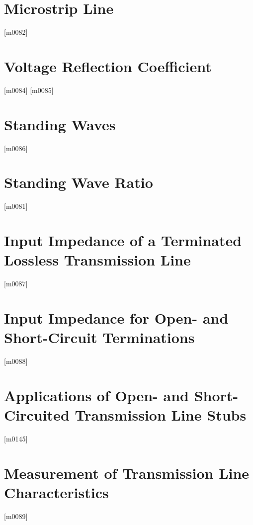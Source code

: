 \documentclass[10pt,letterpaper,twocolumn,openany]{book}
\theoremstyle{definition} %
\begin{document}
    \section{Microstrip Line}
{\color{blue}\tiny[m0082]}      
      \vfill\break
    \section{Voltage Reflection Coefficient}
{\color{blue}\tiny[m0084]}      
      \vfill\break
{\color{blue}\tiny[m0085]}    
    \section{Standing Waves}
{\color{blue}\tiny[m0086]}      
      \vfill\break
    \section{Standing Wave Ratio}
{\color{blue}\tiny[m0081]}      
      \vfill\break
    \section{Input Impedance of a Terminated Lossless Transmission Line}
{\color{blue}\tiny[m0087]}      
      \vfill\break
    \section{Input Impedance for Open- and Short-Circuit Terminations}
{\color{blue}\tiny[m0088]}      
      \vfill\break
    \section{Applications of Open- and Short-Circuited Transmission Line Stubs}
{\color{blue}\tiny[m0145]}      
      \vfill\break
    \section{Measurement of Transmission Line Characteristics}
{\color{blue}\tiny[m0089]}      
      \vfill\break
\end{document}
